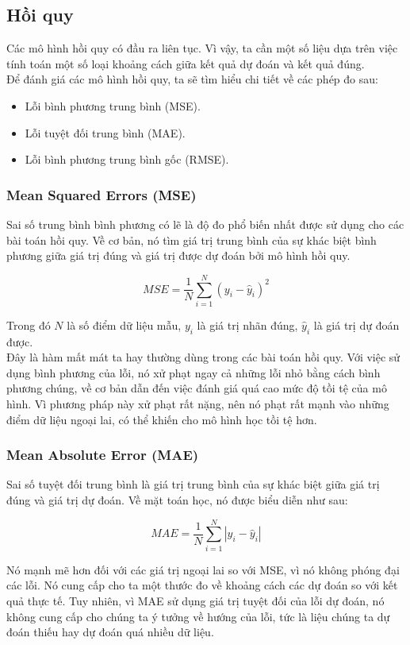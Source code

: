 \subsection{Hồi quy}
Các mô hình hồi quy có đầu ra liên tục. Vì vậy, ta cần một số liệu dựa trên việc tính toán một số loại khoảng cách giữa kết quả dự đoán và kết quả đúng.\\
Để đánh giá các mô hình hồi quy, ta sẽ tìm hiểu chi tiết về các phép đo sau:
\begin{itemize}
    \item Lỗi bình phương trung bình (MSE).
    \item Lỗi tuyệt đối trung bình (MAE).
    \item Lỗi bình phương trung bình gốc (RMSE).
\end{itemize}
\subsubsection{Mean Squared Errors (MSE)}
Sai số trung bình bình phương có lẽ là độ đo phổ biến nhất được sử dụng cho các bài toán hồi quy. Về cơ bản, nó tìm giá trị trung bình của sự khác biệt bình phương giữa giá trị đúng và giá trị được dự đoán bởi mô hình hồi quy.
\begin{center}
    \begin{equation}
         MSE = \frac{1}{N} \sum\limits_{i = 1}^N {{{({y_i} - {{\hat y}_i})}^2}}
    \end{equation}
\end{center}
Trong đó $N$ là số điểm dữ liệu mẫu, $y_i$ là giá trị nhãn đúng, $\hat y_i$ là giá trị dự đoán được.\\
Đây là hàm mất mát ta hay thường dùng trong các bài toán hồi quy. Với việc sử dụng bình phương của lỗi, nó xử phạt ngay cả những lỗi nhỏ bằng cách bình phương chúng, về cơ bản dẫn đến việc đánh giá quá cao mức độ tồi tệ của mô hình. Vì phương pháp này xử phạt rất nặng, nên nó phạt rất mạnh vào những điểm dữ liệu ngoại lai, có thể khiến cho mô hình học tồi tệ hơn.
\subsubsection{Mean Absolute Error (MAE)}
Sai số tuyệt đối trung bình là giá trị trung bình của sự khác biệt giữa giá trị đúng và giá trị dự đoán. Về mặt toán học, nó được biểu diễn như sau:
\begin{center}
    \begin{equation}
        MAE = \frac{1}{N}\sum\limits_{i = 1}^N {\left| {{y_i} - {{\hat y}_i}} \right|} 
    \end{equation}
\end{center}
Nó mạnh mẽ hơn đối với các giá trị ngoại lai so với MSE, vì nó không phóng đại các lỗi. Nó cung cấp cho ta một thước đo về khoảng cách các dự đoán so với kết quả thực tế. Tuy nhiên, vì MAE sử dụng giá trị tuyệt đối của lỗi dự đoán, nó không cung cấp cho chúng ta ý tưởng về hướng của lỗi, tức là liệu chúng ta dự đoán thiếu hay dự đoán quá nhiều dữ liệu.
